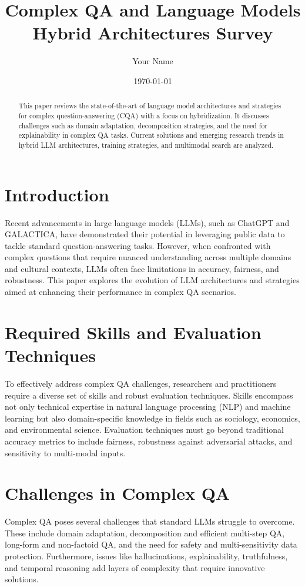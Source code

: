 \documentclass{article}
\title{Complex QA and Language Models Hybrid Architectures Survey}
\author{Your Name}
\date{\today}
\begin{document}
\maketitle

\begin{abstract}
This paper reviews the state-of-the-art of language model architectures and strategies for complex question-answering (CQA) with a focus on hybridization. It discusses challenges such as domain adaptation, decomposition strategies, and the need for explainability in complex QA tasks. Current solutions and emerging research trends in hybrid LLM architectures, training strategies, and multimodal search are analyzed.
\end{abstract}

\tableofcontents
\newpage

\section{Introduction}
Recent advancements in large language models (LLMs), such as ChatGPT and GALACTICA, have demonstrated their potential in leveraging public data to tackle standard question-answering tasks. However, when confronted with complex questions that require nuanced understanding across multiple domains and cultural contexts, LLMs often face limitations in accuracy, fairness, and robustness. This paper explores the evolution of LLM architectures and strategies aimed at enhancing their performance in complex QA scenarios.

\section{Required Skills and Evaluation Techniques}
To effectively address complex QA challenges, researchers and practitioners require a diverse set of skills and robust evaluation techniques. Skills encompass not only technical expertise in natural language processing (NLP) and machine learning but also domain-specific knowledge in fields such as sociology, economics, and environmental science. Evaluation techniques must go beyond traditional accuracy metrics to include fairness, robustness against adversarial attacks, and sensitivity to multi-modal inputs.

\section{Challenges in Complex QA}
Complex QA poses several challenges that standard LLMs struggle to overcome. These include domain adaptation, decomposition and efficient multi-step QA, long-form and non-factoid QA, and the need for safety and multi-sensitivity data protection. Furthermore, issues like hallucinations, explainability, truthfulness, and temporal reasoning add layers of complexity that require innovative solutions.
\end{document}
